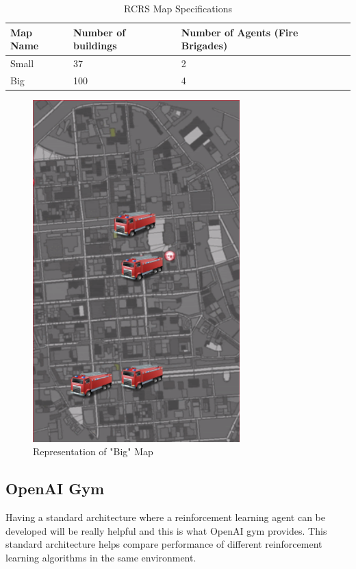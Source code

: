 \documentclass[12pt]{report}
\begin{document}
\begin{table} [!h]
\begin{center}
 \begin{tabular}{l | l | l} 
 \hline
 Map Name & Number of buildings & Number of Agents (Fire Brigades)  \\ [0.5ex] 
 \hline\hline
 Small & 37 & 2\\
 Big & 100 & 4\\
 \hline
\end{tabular}
\caption{RCRS Map Specifications}
\label{table:RCRSMapSpecs}
\end{center}
\end{table}

\begin{figure}[!h]
    \centering
    \includegraphics[width=8cm]{BigMap.png}
    \caption{Representation of "Big" Map}
    \label{fig:BigMap}
\end{figure}


\subsection{OpenAI Gym} \label{OpenAIGym}

Having a standard architecture where a reinforcement learning agent can be developed will be really helpful and this is what OpenAI gym provides. This standard architecture helps compare performance of different reinforcement learning algorithms in the same environment. 
\end{document}
